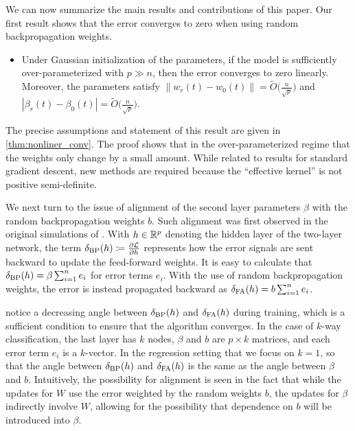 We can now summarize the main results and contributions of this paper. Our first result shows that the error converges to zero when using random backpropagation weights.

\begin{itemize}
  \item Under Gaussian initialization of the parameters, if the model is sufficiently over-parameterized with $p\gg n$, then the error converges to zero linearly. Moreover, the parameters satisfy $\|w_r(t) - w_0(t) \| = \widetilde O\bigl(\frac{n}{\sqrt{p}}\bigr)$
    and $|\beta_r(t) - \beta_0(t) | = \widetilde O\bigl(\frac{n}{\sqrt{p}}\bigr)$.
\end{itemize}
The precise assumptions and statement of this result are given in \cref{thm:nonliner_conv}. The proof
shows that in the over-parameterized regime that the weights only change
by a small amount. While related to results for standard gradient descent,
new methods are required because the ``effective kernel'' is not positive semi-definite.

We next turn to the issue of alignment of the second layer parameters $\beta$ with the random backpropagation weights $b$. Such alignment was first observed in the original simulations of \cite{lillicrap2016random}. With $h\in \mathbb{R}^p$ denoting the hidden layer of the two-layer network,  the term $\delta_\mathrm{BP}(h) \coloneqq \frac{\partial \mathcal{L}}{\partial h}$ represents
how the error signals are sent backward to update the feed-forward weights.
It is easy to calculate that
$\delta_\mathrm{BP}(h) = \beta \sum_{i=1}^n e_i$ for error terms $e_i$. With the use of random backpropagation weights, the error is instead propagated backward as $\delta_\mathrm{FA}(h) = b \sum_{i=1}^n e_i$.


\citet{lillicrap2016random} notice a decreasing angle between $\delta_\mathrm{BP}(h)$ and $\delta_\mathrm{FA}(h)$ during training, which is a sufficient condition to ensure that the algorithm converges.
In the case of $k$-way classification, the last layer has $k$ nodes,
$\beta$ and $b$ are $p\times k$ matrices, and each error term $e_i$ is a $k$-vector.
In the regression setting that we focus on $k=1$, so that the angle between
$\delta_\mathrm{BP}(h)$ and $\delta_\mathrm{FA}(h)$ is the same as the angle between $\beta$ and $b$.
Intuitively, the possibility for alignment is seen in the fact that while the updates for $W$ use the error weighted by the random weights $b$, the updates for $\beta$ indirectly involve $W$, allowing for the possibility that dependence on $b$ will be introduced into $\beta$.

